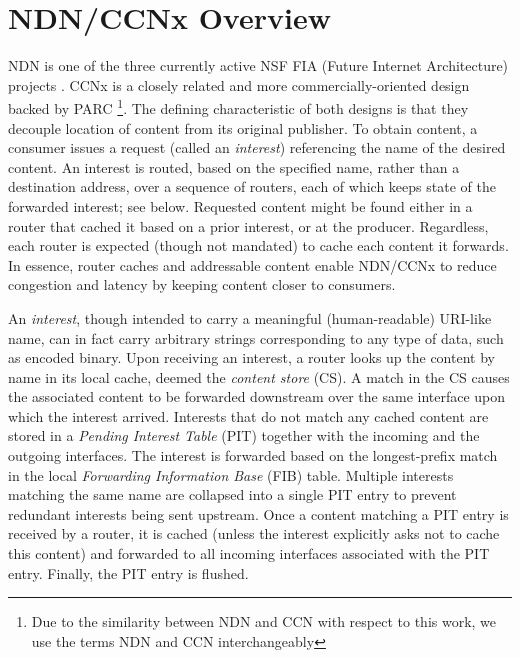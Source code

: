 \section{NDN/CCNx Overview}
NDN is one of the three currently active NSF FIA (Future Internet Architecture) projects \cite{ndnt-techreport}. CCNx is a closely related and more commercially-oriented design backed by PARC \cite{ccnx}\footnote{Due to the similarity between NDN and CCN with respect to this work, we use the terms NDN and CCN interchangeably}. The defining characteristic of both designs is that they decouple location of content from its original publisher. To obtain content, a consumer issues a request (called an {\em interest}) referencing the name of the desired content. An interest is routed, based on the specified name, rather than a destination address, over a sequence of routers, each of which keeps state of the forwarded interest; see below. Requested content might be found either in a router that cached it based on a prior interest, or at the producer. Regardless, each router is expected (though not mandated) to cache each content it forwards. In essence, router caches and addressable content enable NDN/CCNx to reduce congestion and latency by keeping content closer to consumers. 

An \emph{interest}, though intended to carry a meaningful (human-readable) URI-like name, can in fact carry arbitrary strings corresponding to any type of data, such as encoded binary. Upon receiving an interest, a router looks up the content by name in its local cache, deemed the \emph{content store} (CS). A match in the CS causes the associated content to be forwarded downstream over the same interface upon which the interest arrived. Interests that do not match any cached content are stored in a \emph{Pending Interest Table} (PIT) together with the incoming and the outgoing interfaces. The interest is forwarded based on the longest-prefix match in the local \emph{Forwarding Information Base} (FIB) table. Multiple interests matching the same name are collapsed into a single PIT entry to prevent redundant interests being sent upstream. Once a content matching a PIT entry is received by a router, it is cached (unless the interest explicitly asks not to cache this content) and forwarded to all incoming interfaces associated with the PIT entry. Finally, the PIT entry is flushed.

